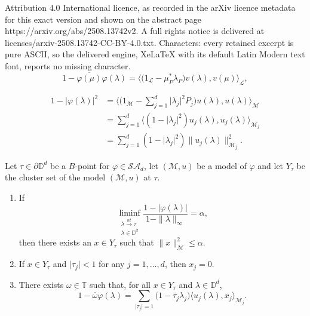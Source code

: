 \documentclass[10pt,a4paper]{amsart}
\begin{document}
Attribution 4.0 International licence, as recorded in the arXiv licence metadata for this exact version and shown on the abstract page https://arxiv.org/abs/2508.13742v2. A full rights notice is delivered at licenses/arxiv-2508.13742-CC-BY-4.0.txt. Characters: every retained excerpt is pure ASCII, so the delivered engine, XeLaTeX with its default Latin Modern text font, reports no missing character.
\begin{equation}\label{modeleqn}
1-\overline{\varphi(\mu)}\varphi(\lambda) = \Big\langle{\big(1_{\mathcal{L}}-\mu_{P}^{*}\lambda_{P}\big)v({\lambda}),v({\mu})} \Big\rangle_{\mathcal{L}},
\end{equation}

\begin{align}
1-\lvert\varphi(\lambda)\rvert^{2} &= \Big\langle{\big(1_{\mathcal{M}}-\sum_{j=1}^{d}\lvert \lambda_{j}\rvert^{2}P_{j}\big)u({\lambda}),u({\lambda})} \Big\rangle_{\mathcal{M}}\nonumber\\
    &=\sum_{j=1}^{d}\Big\langle (1-\lvert \lambda_{j}\rvert^{2})u_{j}({\lambda}),u_{j}({\lambda}) \Big\rangle_{\mathcal{M}_{j}}\nonumber\\
    &=\sum_{j=1}^{d}(1-\lvert \lambda_{j}\rvert^{2})\|u_{j}(\lambda)\|^{2}_{\mathcal{M}_{j}}.\label{whenlambdametmu}
\end{align}

\begin{proposition}\label{prop4.2generalized}
Let $\tau\in\partial\mathbb{D}^{d}$ be a $B$-point for $\varphi\in\mathcal{SA}_{d}$, let $(\mathcal{M},u)$ be a model of $\varphi$ and let $Y_{\tau}$ be the cluster set of the  model $(\mathcal{M},u)$ at $\tau$.
\begin{enumerate}
\item If
   $$\liminf_{\substack {\lambda{\overset{nt}\rightarrow}\tau \\ \lambda \in \mathbb{D}^{d}}} \dfrac{1-\lvert \varphi(\lambda) \rvert}{1-\|\lambda\|_{\infty}}=\alpha,$$
then there exists an $x\in Y_{\tau}$ such that $\| x\|^{2}_{\mathcal{M}}\leq \alpha$.
\item If $x\in Y_{\tau}$ and $\lvert\tau_{j}\rvert< 1$ for any $j=1,\hdots,d$, then $x_{j}=0$.
\item There exists $\omega\in\mathbb{T}$ such that, for all $x\in Y_{\tau}$ and $\lambda\in\mathbb{D}^{d}$,
    \begin{equation}\label{omegaequationintheoremstatement}
   1-\overline{\omega}\varphi(\lambda)=\sum_{\lvert \tau_{j} \rvert = 1}\Big(1-\overline{\tau}_{j}\lambda_{j}\Big)\langle u_{j}(\lambda),x_{j}\rangle_{\mathcal{M}_{j}}.
    \end{equation}
\end{enumerate} 
\end{proposition}
\end{document}

